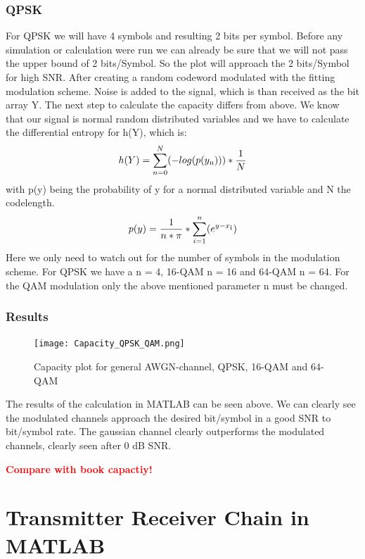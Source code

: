 \documentclass[12pt,oneside, reqno]{report}
\newcommand\boldred[1]{\textcolor{red}{\textbf{#1}}}
\begin{document}
\subsection{QPSK}
For QPSK we will have 4 symbols and resulting 2 bits per symbol. Before any simulation or calculation were run we can already be sure that we will not pass the upper bound of 2 bits/Symbol. So the plot will approach the 2 bits/Symbol for high SNR.
After creating a random codeword modulated with the fitting modulation scheme. Noise is added to the signal, which is than received as the bit array Y. The next step to calculate the capacity differs from above. 
\newline
We know that our signal is normal random distributed variables and we have to calculate the differential entropy for h(Y), which is:
\begin{equation}
\label{eq:entropy}
h(Y) =  \sum_{n=0}^N(-log(p(y\textsubscript{n}))) * \frac{1}{N}
\end{equation} 
with p(y) being the probability of y for a normal distributed variable and N the codelength.
\begin{equation}
p(y) = \frac{1}{n*\pi}*\sum_{i=1}^n(e^{y-x\textsubscript{i}})
\end{equation} 
Here we only need to watch out for the number of symbols in the modulation scheme. For QPSK we have a n = 4, 16-QAM n = 16 and 64-QAM n = 64.
\newline
For the QAM modulation only the above mentioned parameter n must be changed.
 

\subsection{Results}
\begin{figure}[H]
	\centering
	\texttt{[image: Capacity\_QPSK\_QAM.png]}
	\caption{Capacity plot for general AWGN-channel, QPSK, 16-QAM and 64-QAM}
	\label{fig:Modulation}
\end{figure}
The results of the calculation in MATLAB can be seen above. We can clearly see the modulated channels approach the desired bit/symbol in a good SNR to bit/symbol rate. The gaussian channel clearly outperforms the modulated channels, clearly seen after 0 dB SNR.

\boldred{Compare with book capactiy!}


\chapter{Transmitter Receiver Chain in MATLAB}
\end{document}
